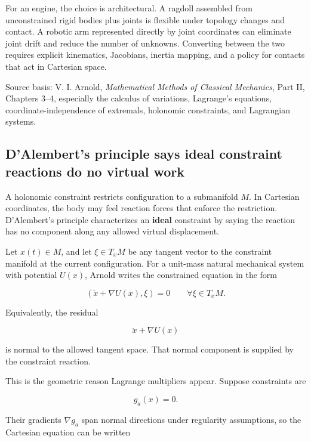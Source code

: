 For an engine, the choice is architectural. A ragdoll assembled from unconstrained rigid bodies plus joints is flexible under topology changes and contact. A robotic arm represented directly by joint coordinates can eliminate joint drift and reduce the number of unknowns. Converting between the two requires explicit kinematics, Jacobians, inertia mapping, and a policy for contacts that act in Cartesian space.

Source basis: V. I. Arnold, \emph{Mathematical Methods of Classical Mechanics}, Part II, Chapters 3--4, especially the calculus of variations, Lagrange's equations, coordinate-independence of extremals, holonomic constraints, and Lagrangian systems.

\subsection{D'Alembert's principle says ideal constraint reactions do no virtual work}\label{02-foundations-ii-ch039-dalemberts-principle-says-ideal-constraint-reactions-do-no-virtual-work}

\hypertarget{02-foundations-ii-ch039-dalemberts-principle-says-ideal-constraint-reactions-do-no-virtual-work}{}

A holonomic constraint restricts configuration to a submanifold \(M\). In Cartesian coordinates, the body may feel reaction forces that enforce the restriction. D'Alembert's principle characterizes an \textbf{ideal} constraint by saying the reaction has no component along any allowed virtual displacement.

Let \(x(t)\in M\), and let \(\xi\in T_xM\) be any tangent vector to the constraint manifold at the current configuration. For a unit-mass natural mechanical system with potential \(U(x)\), Arnold writes the constrained equation in the form

\[
\left(
\ddot x+\nabla U(x),
\xi
\right)
=
0
\qquad
\forall \xi\in T_xM.
\]

Equivalently, the residual

\[
\ddot x+\nabla U(x)
\]

is normal to the allowed tangent space. That normal component is supplied by the constraint reaction.

This is the geometric reason Lagrange multipliers appear. Suppose constraints are

\[
g_a(x)=0.
\]

Their gradients \(\nabla g_a\) span normal directions under regularity assumptions, so the Cartesian equation can be written

